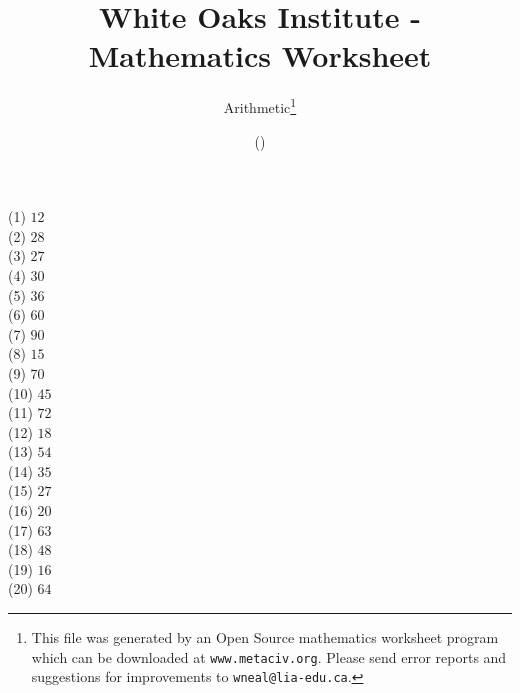 \documentclass[letter]{article}
\begin{document}
\title{White Oaks Institute - Mathematics Worksheet}
\author{Arithmetic\thanks{This file was generated by an \textsf{Open Source} mathematics worksheet program which can be downloaded at \texttt{www.metaciv.org}. Please send error reports and suggestions for improvements to \texttt{wneal@lia-edu.ca}.}}
\date{\XCfileversion{} (\XCfiledate)}
\maketitle
\setlength{\parskip}{12mm plus 4mm minus 4mm}\setlength{\parindent}{0cm}\begin{multicols}{2}(1) $12$\\(2) $28$\\(3) $27$\\(4) $30$\\(5) $36$\\(6) $60$\\(7) $90$\\(8) $15$\\(9) $70$\\(10) $45$\\(11) $72$\\(12) $18$\\(13) $54$\\(14) $35$\\(15) $27$\\(16) $20$\\(17) $63$\\(18) $48$\\(19) $16$\\(20) $64$\\\end{multicols}
\end{document}
